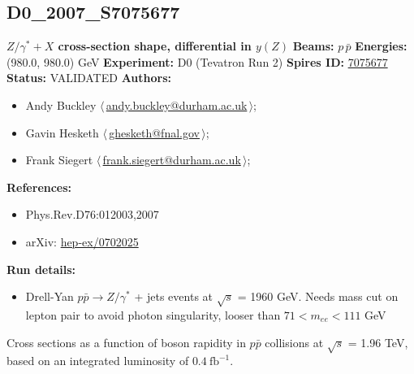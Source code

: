 \clearpage


\clearpage

\subsection[D0\_2007\_S7075677]{D0\_2007\_S7075677\,\cite{Abazov:2007jy}}
\textbf{$Z/\gamma^* + X$ cross-section shape, differential in $y(Z)$}\newline
\textbf{Beams:} $p$\,$\bar{p}$ \newline
\textbf{Energies:} (980.0, 980.0) GeV \newline
\textbf{Experiment:} D0 (Tevatron Run 2) \newline
\textbf{Spires ID:} \href{http://www.slac.stanford.edu/spires/find/hep/www?rawcmd=key+7075677}{7075677}\newline
\textbf{Status:} VALIDATED\newline
\textbf{Authors:}
\begin{itemize}
  \item Andy Buckley $\langle\,$\href{mailto:andy.buckley@durham.ac.uk}{andy.buckley@durham.ac.uk}$\,\rangle$;
  \item Gavin Hesketh $\langle\,$\href{mailto:ghesketh@fnal.gov}{ghesketh@fnal.gov}$\,\rangle$;
  \item Frank Siegert $\langle\,$\href{mailto:frank.siegert@durham.ac.uk}{frank.siegert@durham.ac.uk}$\,\rangle$;
\end{itemize}
\textbf{References:}
\begin{itemize}
  \item Phys.Rev.D76:012003,2007
  \item arXiv: \href{http://arxiv.org/abs/hep-ex/0702025}{hep-ex/0702025}
\end{itemize}
\textbf{Run details:}
\begin{itemize}

  \item Drell-Yan $p \bar{p} \to Z/\gamma^*$ + jets events at $\sqrt{s}$ = 1960 GeV. Needs mass cut on lepton pair to avoid photon singularity, looser than  $71 < m_{ee} < 111$ GeV\end{itemize}

\noindent Cross sections as a function of boson rapidity in $p \bar{p}$ collisions at $\sqrt{s}$ = 1.96 TeV, based on an integrated luminosity of $0.4~\text{fb}^{-1}$.

\clearpage


